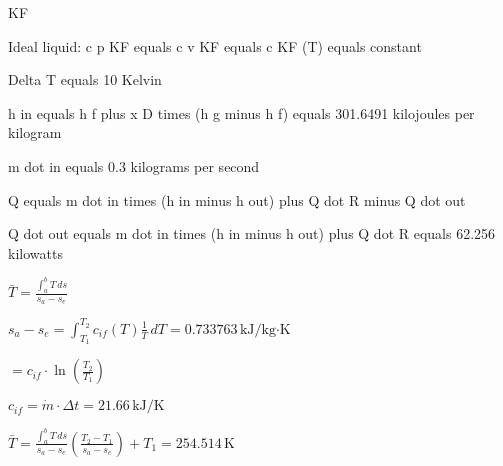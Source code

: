 KF  

Ideal liquid:  
c p KF equals c v KF equals c KF (T) equals constant  

Delta T equals 10 Kelvin  

h in equals h f plus x D times (h g minus h f) equals 301.6491 kilojoules per kilogram  

m dot in equals 0.3 kilograms per second  

Q equals m dot in times (h in minus h out) plus Q dot R minus Q dot out  

Q dot out equals m dot in times (h in minus h out) plus Q dot R equals 62.256 kilowatts

\( \bar{T} = \frac{\int_a^b T \, ds}{s_a - s_e} \)  

\( s_a - s_e = \int_{T_1}^{T_2} c_{if}(T) \frac{1}{T} \, dT = 0.733763 \, \text{kJ/kg·K} \)  

\( = c_{if} \cdot \ln\left(\frac{T_2}{T_1}\right) \)  

\( c_{if} = \dot{m} \cdot \Delta t = 21.66 \, \text{kJ/K} \)  

\( \bar{T} = \frac{\int_a^b T \, ds}{s_a - s_e} \left(\frac{T_2 - T_1}{s_a - s_e}\right) + T_1 = 254.514 \, \text{K} \)